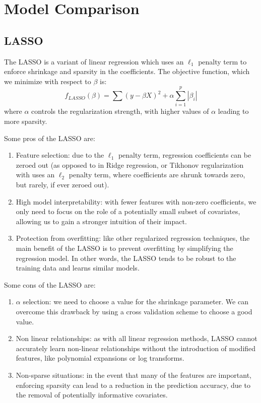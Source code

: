 \documentclass[12pt]{article}
\begin{document}
\section{Model Comparison} %
\label{sec:model_comparison}

\subsection{LASSO} %
\label{sub:lasso}

The LASSO is a variant of linear regression which uses an $\ell_1$ penalty term to enforce shrinkage and sparsity in the coefficients. 
The objective function, which we minimize with respect to $\beta$ is:
\begin{equation}
  f_{LASSO}(\beta) = \sum (y - \beta X)^2 + \alpha \sum_{i=1}^p |\beta_i|
\end{equation}
where $\alpha$ controls the regularization strength, with higher values of $\alpha$ leading to more sparsity.

Some pros of the LASSO are:
\begin{enumerate}
  \item Feature selection: due to the $\ell_1$ penalty term, regression coefficients can be zeroed out (as opposed to in Ridge regression, or Tikhonov regularization with uses an $\ell_2$ penalty term, where coefficients are shrunk towards zero, but rarely, if ever zeroed out).
  \item High model interpretability: with fewer features with non-zero coefficients, we only need to focus on the role of a potentially small subset of covariates, allowing us to gain a stronger intuition of their impact.
  \item Protection from overfitting: like other regularized regression techniques, the main benefit of the LASSO is to prevent overfitting by simplifying the regression model. In other words, the LASSO tends to be robust to the training data and learns similar models.
\end{enumerate}

Some cons of the LASSO are:
\begin{enumerate}
  \item $\alpha$ selection: we need to choose a value for the shrinkage parameter. We can overcome this drawback by using a cross validation scheme to choose a good value.
  \item Non linear relationships: as with all linear regression methods, LASSO cannot accurately learn non-linear relationships without the introduction of modified features, like polynomial expansions or log transforms.
  \item Non-sparse situations: in the event that many of the features are important, enforcing sparsity can lead to a reduction in the prediction accuracy, due to the removal of potentially informative covariates.
\end{enumerate}
\end{document}
